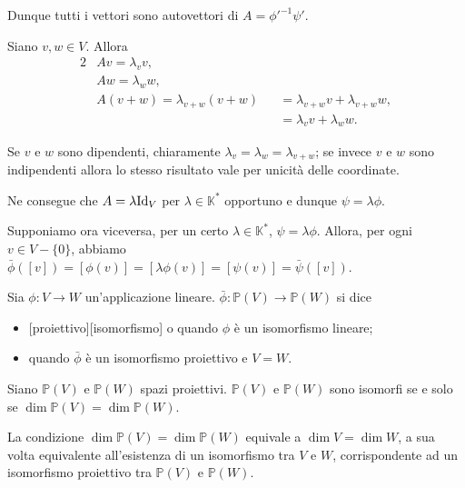 	\par Dunque tutti i vettori sono autovettori di $A = \phi'^{-1} \psi'$.
	\par Siano $v, w \in V$. Allora
\begin{alignat*}{2}
	&Av = \lambda_v v,\\
	&Aw = \lambda_w w,\\
	&A(v + w) = \lambda_{v + w}(v + w) &&= \lambda_{v+w} v + \lambda_{v+w} w,\\
	&&&= \lambda_v v + \lambda_w w.
\end{alignat*}
	\par Se $v$ e $w$ sono dipendenti, chiaramente $\lambda_v = \lambda_w = \lambda_{v + w}$; se invece $v$ e $w$ sono indipendenti allora lo stesso risultato vale per unicit\`a delle coordinate.
	\par Ne consegue che $A = \lambda \Identity_V$ per $\lambda \in \mathbb{K}^*$ opportuno e dunque $\psi = \lambda \phi$.
	\par Supponiamo ora viceversa, per un certo $\lambda \in \mathbb{K}^*$, $\psi = \lambda\phi$. Allora, per ogni $v \in V - \lbrace 0 \rbrace$, abbiamo $\bar{\phi}([v]) = [\phi(v)] = [\lambda\phi(v)] = [\psi(v)] = \bar{\psi}([v])$. \EndProof
\begin{Definition}\label{def6}
	Sia $\phi: V \rightarrow W$ un'applicazione lineare. $\bar{\phi}: \mathbb{P}(V) \rightarrow \mathbb{P}(W)$ si dice
	\begin{itemize}
		\item {}[proiettivo][isomorfismo] o  quando $\phi$ \`e un isomorfismo lineare;
		\item {} quando $\bar{\phi}$ \`e un isomorfismo proiettivo e $V = W$.
	\end{itemize}
\end{Definition}
\begin{Theorem}\label{th3}
	Siano $\mathbb{P}(V)$ e $\mathbb{P}(W)$ spazi proiettivi. $\mathbb{P}(V)$ e $\mathbb{P}(W)$ sono isomorfi se e solo se $\dim \mathbb{P}(V) = \dim \mathbb{P}(W)$.
\end{Theorem}
\Proof La condizione $\dim \mathbb{P}(V) = \dim \mathbb{P}(W)$ equivale a $\dim V = \dim W$, a sua volta equivalente all'esistenza di un isomorfismo tra $V$ e $W$, corrispondente ad un isomorfismo proiettivo tra $\mathbb{P}(V)$ e $\mathbb{P}(W)$. \EndProof
